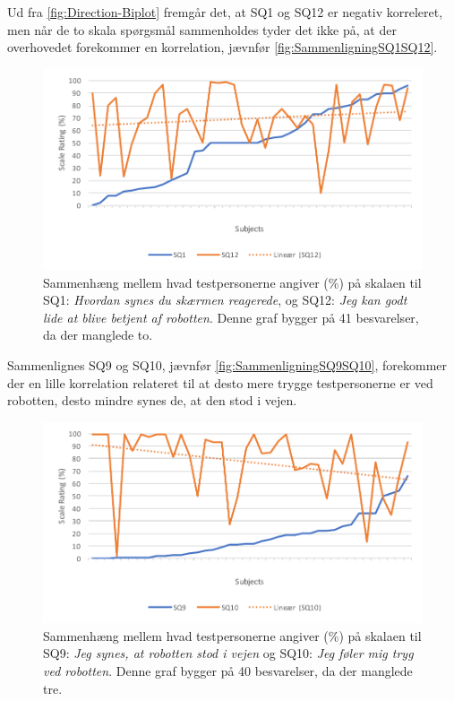Ud fra \autoref{fig:Direction-Biplot} fremgår det, at SQ1 og SQ12 er negativ korreleret, men når de to skala spørgsmål sammenholdes tyder det ikke på, at der overhovedet forekommer en korrelation, jævnfør \autoref{fig:SammenligningSQ1SQ12}.  
%
\begin{figure}[H]
	\centering
	\includegraphics[width=\textwidth]{Figure/Korrelationsgrafer/SQ1+SQ12}
	\caption{Sammenhæng mellem hvad testpersonerne angiver (\%) på skalaen til SQ1: \textit{Hvordan synes du skærmen reagerede}, og SQ12: \textit{Jeg kan godt lide at blive betjent af robotten}. Denne graf bygger på 41 besvarelser, da der manglede to.}
	\label{fig:SammenligningSQ1SQ12}
\end{figure}
\newpage
\noindent
%
Sammenlignes SQ9 og SQ10, jævnfør \autoref{fig:SammenligningSQ9SQ10}, forekommer der en lille korrelation relateret til at desto mere trygge testpersonerne er ved robotten, desto mindre synes de, at den stod i vejen. 
%
\begin{figure}[H]
	\centering
	\includegraphics[width=\textwidth]{Figure/Korrelationsgrafer/SQ9+SQ10}
	\caption{Sammenhæng mellem hvad testpersonerne angiver (\%) på skalaen til SQ9: \textit{Jeg synes, at robotten stod i vejen} og SQ10: \textit{Jeg føler mig tryg ved robotten}. Denne graf bygger på 40 besvarelser, da der manglede tre.}
	\label{fig:SammenligningSQ9SQ10}
\end{figure}
